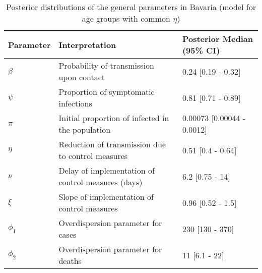 \begin{table}[ht]
\centering
\begin{tabular}{lp{9cm}p{3cm}}
  \hline
Parameter & Interpretation & Posterior Median (95\% CI) \\ 
  \hline
$\beta$ & Probability of transmission upon contact & 0.24 [0.19 - 0.32] \\ 
  $\psi$ & Proportion of symptomatic infections & 0.81 [0.71 - 0.89] \\ 
  $\pi$ & Initial proportion of infected in the population & 0.00073 [0.00044 - 0.0012] \\ 
  $\eta$ & Reduction of transmission due to control measures & 0.51 [0.4 - 0.64] \\ 
  $\nu$ & Delay of implementation of control measures (days) & 6.2 [0.75 - 14] \\ 
  $\xi$ & Slope of implementation of control measures & 0.96 [0.52 - 1.5] \\ 
  $\phi_1$ & Overdispersion parameter for cases & 230 [130 - 370] \\ 
  $\phi_2$ & Overdispersion parameter for deaths & 11 [6.1 - 22] \\ 
   \hline
\end{tabular}
\caption{Posterior distributions of the general parameters in Bavaria (model for age groups with common $\eta$)} 
\label{tab:ParamTableBavaria_Age_CommonEta}
\end{table}
